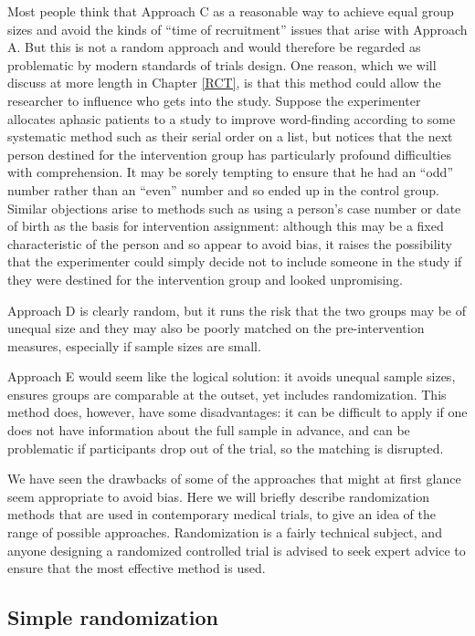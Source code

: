 \documentclass{krantz}
\begin{document}
Most people think that Approach C as a reasonable way to achieve equal group sizes and avoid the kinds of ``time of recruitment'' issues that arise with Approach A. But this is not a random approach and would therefore be regarded as problematic by modern standards of trials design. One reason, which we will discuss at more length in Chapter \ref{RCT}, is that this method could allow the researcher to influence who gets into the study. Suppose the experimenter allocates aphasic patients to a study to improve word-finding according to some systematic method such as their serial order on a list, but notices that the next person destined for the intervention group has particularly profound difficulties with comprehension. It may be sorely tempting to ensure that he had an ``odd'' number rather than an ``even'' number and so ended up in the control group. Similar objections arise to methods such as using a person's case number or date of birth as the basis for intervention assignment: although this may be a fixed characteristic of the person and so appear to avoid bias, it raises the possibility that the experimenter could simply decide not to include someone in the study if they were destined for the intervention group and looked unpromising.

Approach D is clearly random, but it runs the risk that the two groups may be of unequal size and they may also be poorly matched on the pre-intervention measures, especially if sample sizes are small.

Approach E would seem like the logical solution: it avoids unequal sample sizes, ensures groups are comparable at the outset, yet includes randomization. This method does, however, have some disadvantages: it can be difficult to apply if one does not have information about the full sample in advance, and can be problematic if participants drop out of the trial, so the matching is disrupted.

We have seen the drawbacks of some of the approaches that might at first glance seem appropriate to avoid bias. Here we will briefly describe randomization methods that are used in contemporary medical trials, to give an idea of the range of possible approaches. Randomization is a fairly technical subject, and anyone designing a randomized controlled trial is advised to seek expert advice to ensure that the most effective method is used.

\hypertarget{simple-randomization}{%
\subsection{Simple randomization}\label{simple-randomization}}
\end{document}
